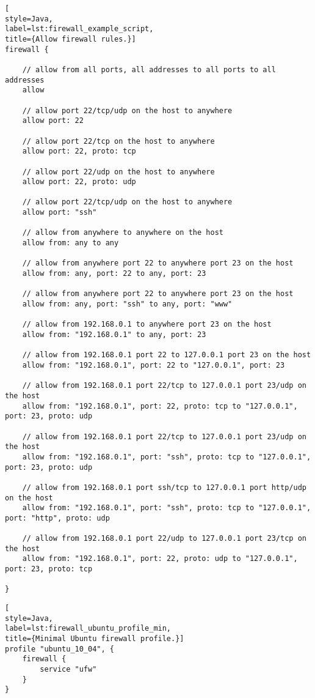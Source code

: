 \begin{lstlisting}[
style=Java,
label=lst:firewall_example_script,
title={Allow firewall rules.}]
firewall {

    // allow from all ports, all addresses to all ports to all addresses
    allow

    // allow port 22/tcp/udp on the host to anywhere
    allow port: 22

    // allow port 22/tcp on the host to anywhere
    allow port: 22, proto: tcp

    // allow port 22/udp on the host to anywhere
    allow port: 22, proto: udp

    // allow port 22/tcp/udp on the host to anywhere
    allow port: "ssh"

    // allow from anywhere to anywhere on the host
    allow from: any to any

    // allow from anywhere port 22 to anywhere port 23 on the host
    allow from: any, port: 22 to any, port: 23

    // allow from anywhere port 22 to anywhere port 23 on the host
    allow from: any, port: "ssh" to any, port: "www"

    // allow from 192.168.0.1 to anywhere port 23 on the host
    allow from: "192.168.0.1" to any, port: 23

    // allow from 192.168.0.1 port 22 to 127.0.0.1 port 23 on the host
    allow from: "192.168.0.1", port: 22 to "127.0.0.1", port: 23

    // allow from 192.168.0.1 port 22/tcp to 127.0.0.1 port 23/udp on the host
    allow from: "192.168.0.1", port: 22, proto: tcp to "127.0.0.1", port: 23, proto: udp

    // allow from 192.168.0.1 port 22/tcp to 127.0.0.1 port 23/udp on the host
    allow from: "192.168.0.1", port: "ssh", proto: tcp to "127.0.0.1", port: 23, proto: udp

    // allow from 192.168.0.1 port ssh/tcp to 127.0.0.1 port http/udp on the host
    allow from: "192.168.0.1", port: "ssh", proto: tcp to "127.0.0.1", port: "http", proto: udp

    // allow from 192.168.0.1 port 22/udp to 127.0.0.1 port 23/tcp on the host
    allow from: "192.168.0.1", port: 22, proto: udp to "127.0.0.1", port: 23, proto: tcp

}
\end{lstlisting}

\begin{lstlisting}[
style=Java,
label=lst:firewall_ubuntu_profile_min,
title={Minimal Ubuntu firewall profile.}]
profile "ubuntu_10_04", {
    firewall {
        service "ufw"
    }
}
\end{lstlisting}
